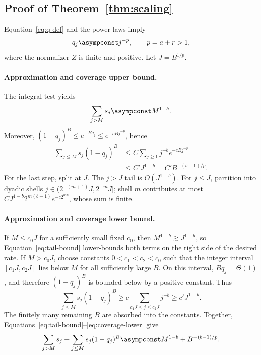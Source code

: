 \subsection{Proof of Theorem~\ref{thm:scaling}}

Equation~\eqref{eq:q-def} and the power laws imply
\begin{equation}
q_j\asympconst j^{-p},
\qquad p=a+r>1,
\label{eq:q-power}
\end{equation}
where the normalizer $Z$ is finite and positive. Let
$J=B^{1/p}$.

\paragraph{Approximation and coverage upper bound.}
The integral test yields
\begin{equation}
\sum_{j>M}s_j\asympconst M^{1-b}.
\label{eq:tail-bound}
\end{equation}
Moreover, $(1-q_j)^B\le e^{-Bq_j}\le e^{-cBj^{-p}}$, hence
\begin{align}
\sum_{j\le M}s_j(1-q_j)^B
&\le C\sum_{j\ge1}j^{-b}e^{-cBj^{-p}}\\
&\le C'J^{1-b}=C'B^{-(b-1)/p}.
\label{eq:coverage-upper}
\end{align}
For the last step, split at $J$. The $j>J$ tail is $O(J^{1-b})$. For
$j\le J$, partition into dyadic shells
$j\in(2^{-(m+1)}J,2^{-m}J]$; shell $m$ contributes at most
$CJ^{1-b}2^{m(b-1)}e^{-c2^{mp}}$, whose sum is finite.

\paragraph{Approximation and coverage lower bound.}
If $M\le c_0J$ for a sufficiently small fixed $c_0$, then
$M^{1-b}\gtrsim J^{1-b}$, so Equation~\eqref{eq:tail-bound} lower-bounds both
terms on the right side of the desired rate. If $M>c_0J$, choose constants
$0<c_1<c_2<c_0$ such that the integer interval
$[c_1J,c_2J]$ lies below $M$ for all sufficiently large $B$. On this interval,
$Bq_j=\Theta(1)$, and therefore $(1-q_j)^B$ is bounded below by a positive
constant. Thus
\begin{equation}
\sum_{j\le M}s_j(1-q_j)^B
\ge c\sum_{c_1J\le j\le c_2J}j^{-b}
\ge c'J^{1-b}.
\label{eq:coverage-lower}
\end{equation}
The finitely many remaining $B$ are absorbed into the constants. Together,
Equations~\eqref{eq:tail-bound}--\eqref{eq:coverage-lower} give
\begin{equation}
\sum_{j>M}s_j+\sum_{j\le M}s_j(1-q_j)^B
\asympconst M^{1-b}+B^{-(b-1)/p}.
\label{eq:bias-rate}
\end{equation}

